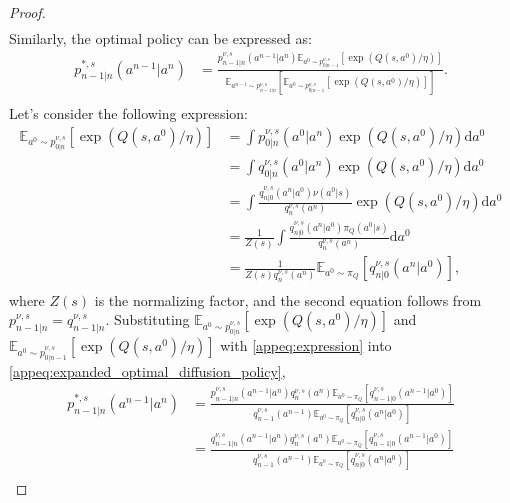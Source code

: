 \begin{proof}
\begin{equation}
\begin{aligned}
    \end{aligned}
\end{equation}
Similarly, the optimal policy can be expressed as: 
\begin{equation}\label{appeq:expanded_optimal_diffusion_policy}
    \begin{aligned}
        p^{*, s}_{n-1|n}(a^{n-1}|a^n)&=\frac{p^{\nu,s}_{n-1|n}(a^{n-1}|a^n)\mathbb{E}_{a^0\sim p^{\nu,s}_{0|n-1}}\left[\exp(Q(s, a^0)/\eta)\right]}{\mathbb{E}_{a^{n-1}\sim p^{\nu,s}_{n-1|n}}\left[\mathbb{E}_{a^0\sim p^{\nu,s}_{0|n-1}}\left[\exp(Q(s, a^0)/\eta)\right]\right]}.\\
    \end{aligned}
\end{equation}
Let's consider the following expression:
\begin{equation}\label{appeq:expression}
    \begin{aligned}
    \mathbb{E}_{a^0\sim p^{\nu,s}_{0|n}}\left[\exp(Q(s, a^0)/\eta)\right]&=\int p^{\nu,s}_{0|n}(a^0|a^n)\exp(Q(s, a^0)/\eta)\mathrm{d} a^0\\
    &=\int q^{\nu,s}_{0|n}(a^0|a^n)\exp(Q(s, a^0)/\eta)\mathrm{d} a^0\\
    &=\int \frac{q^{\nu,s}_{n|0}(a^n|a^0)\nu(a^0|s)}{q^{\nu,s}_n(a^n)}\exp(Q(s, a^0)/\eta)\mathrm{d} a^0\\
    &=\frac 1{Z(s)}\int \frac{q^{\nu,s}_{n|0}(a^n|a^0)\pi_Q(a^0|s)}{q^{\nu,s}_n(a^n)}\mathrm{d} a^0\\
    &=\frac{1}{Z(s)q^{\nu,s}_n(a^n)}\mathbb{E}_{a^0\sim\pi_Q}\left[q^{\nu,s}_{n|0}(a^n|a^0)\right],\\
    \end{aligned}
\end{equation}
where $Z(s)$ is the normalizing factor, and the second equation follows from $p^{\nu,s}_{n-1|n}=q^{\nu,s}_{n-1|n}$. Substituting $\mathbb{E}_{a^0\sim p^{\nu,s}_{0|n}}\left[\exp(Q(s, a^0)/\eta)\right]$ and $\mathbb{E}_{a^0\sim p^{\nu,s}_{0|n-1}}\left[\exp(Q(s, a^0)/\eta)\right]$ with \eqref{appeq:expression} into \eqref{appeq:expanded_optimal_diffusion_policy}, 
\begin{equation}
    \begin{aligned}
        p^{*, s}_{n-1|n}(a^{n-1}|a^n)&=\frac{p^{\nu,s}_{n-1|n}(a^{n-1}|a^n)q^{\nu,s}_n(a^n)\mathbb{E}_{a^0\sim\pi_Q}\left[q^{\nu,s}_{n-1|0}(a^{n-1}|a^0)\right]}{q^{\nu,s}_{n-1}(a^{n-1})\mathbb{E}_{a^0\sim\pi_Q}\left[q^{\nu,s}_{n|0}(a^n|a^0)\right]}\\
        &=\frac{q^{\nu,s}_{n-1|n}(a^{n-1}|a^n)q^{\nu,s}_n(a^n)\mathbb{E}_{a^0\sim\pi_Q}\left[q^{\nu,s}_{n-1|0}(a^{n-1}|a^0)\right]}{q^{\nu,s}_{n-1}(a^{n-1})\mathbb{E}_{a^0\sim\pi_Q}\left[q^{\nu,s}_{n|0}(a^n|a^0)\right]}\\

\end{aligned}
\end{equation}
\end{proof}
